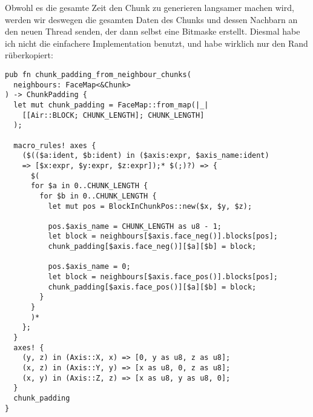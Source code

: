 Obwohl es die gesamte Zeit den Chunk zu generieren
langsamer machen wird, werden wir deswegen die gesamten
Daten des Chunks und dessen Nachbarn an den neuen
Thread senden, der dann selbst eine Bitmaske erstellt.
Diesmal habe ich nicht die einfachere Implementation
benutzt, und habe wirklich nur den Rand rüberkopiert:

\begin{verbatim}
pub fn chunk_padding_from_neighbour_chunks(
  neighbours: FaceMap<&Chunk>
) -> ChunkPadding {
  let mut chunk_padding = FaceMap::from_map(|_|
    [[Air::BLOCK; CHUNK_LENGTH]; CHUNK_LENGTH]
  );

  macro_rules! axes {
    ($(($a:ident, $b:ident) in ($axis:expr, $axis_name:ident)
    => [$x:expr, $y:expr, $z:expr]);* $(;)?) => {
      $(
      for $a in 0..CHUNK_LENGTH {
        for $b in 0..CHUNK_LENGTH {
          let mut pos = BlockInChunkPos::new($x, $y, $z);

          pos.$axis_name = CHUNK_LENGTH as u8 - 1;
          let block = neighbours[$axis.face_neg()].blocks[pos];
          chunk_padding[$axis.face_neg()][$a][$b] = block;

          pos.$axis_name = 0;
          let block = neighbours[$axis.face_pos()].blocks[pos];
          chunk_padding[$axis.face_pos()][$a][$b] = block;
        }
      }
      )*
    };
  }
  axes! {
    (y, z) in (Axis::X, x) => [0, y as u8, z as u8];
    (x, z) in (Axis::Y, y) => [x as u8, 0, z as u8];
    (x, y) in (Axis::Z, z) => [x as u8, y as u8, 0];
  }
  chunk_padding
}
\end{verbatim}


